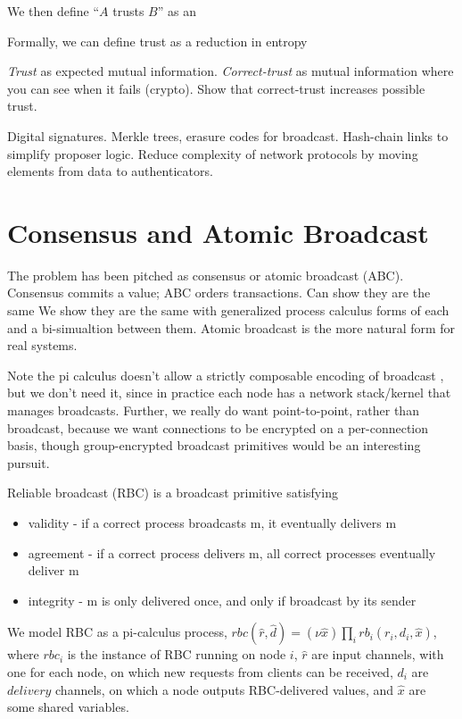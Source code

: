 We then define ``$A$ trusts $B$'' as an


Formally, we can define trust as a reduction in entropy 





\emph{Trust} as expected mutual information.
\emph{Correct-trust} as mutual information where you can see when it fails (crypto).
Show that correct-trust increases possible trust.

Digital signatures.
Merkle trees, erasure codes for broadcast.
Hash-chain links to simplify proposer logic.
Reduce complexity of network protocols by moving elements from data to authenticators.






\section{Consensus and Atomic Broadcast}
The problem has been pitched as consensus or atomic broadcast (ABC).
Consensus commits a value; ABC orders transactions.
Can show they are the same \cite{chandra1996unreliable}
We show they are the same with generalized process calculus forms of each and a bi-simualtion between them.
Atomic broadcast is the more natural form for real systems.

Note the pi calculus doesn't allow a strictly composable encoding of broadcast \cite{ene1999expressiveness},
but we don't need it, since in practice each node has a network stack/kernel that manages broadcasts.
Further, we really do want point-to-point, rather than broadcast,
because we want connections to be encrypted on a per-connection basis,
though group-encrypted broadcast primitives would be an interesting pursuit.

Reliable broadcast (RBC) is a broadcast primitive satisfying

\begin{itemize}
\item validity - if a correct process broadcasts m, it eventually delivers m
\item agreement - if a correct process delivers m, all correct processes eventually deliver m
\item integrity - m is only delivered once, and only if broadcast by its sender
\end{itemize}

We model RBC as a pi-calculus process, 
$rbc(\hat{r}, \hat{d}) = (\nu \hat{x}) \prod_i rb_i(r_i, d_i, \hat{x})$,
where $rbc_i$ is the instance of RBC running on node $i$, 
$\hat{r}$ are input channels, with one for each node, 
on which new requests from clients can be received, 
$d_i$ are $delivery$ channels, on which a node outputs RBC-delivered values,
and $\hat{x}$ are some shared variables.

